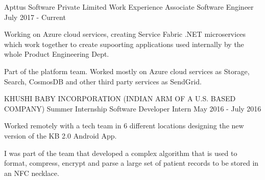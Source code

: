 \begin{cventries}

\cventry
    {Apttus Software Private Limited}
    {Work Experience}
    {Associate Software Engineer}
    {July 2017 - Current}
    {
      \begin{cvitems}
    \item {Working on Azure cloud services, creating Service Fabric .NET microservices which work together to create supoorting applications used internally by the whole Product Engineering Dept.
    }
    \item {Part of the platform team. Worked mostly on Azure cloud services as Storage, Search, CosmosDB and other third party services as SendGrid.
    }
      \end{cvitems}
    }
    
\cventry
    {KHUSHI BABY INCORPORATION (INDIAN ARM OF A U.S. BASED COMPANY)}
    {Summer Internship}
    {Software Developer Intern}
    {May 2016 - July 2016}
    {
      \begin{cvitems}
    \item {Worked remotely with a tech team in 6 different locations designing the new version of the KB 2.0 Android App.
    }
    \item {I was part of the team that developed a complex algorithm that is used to format, compress, encrypt and parse a large set of patient records to be stored in an NFC necklace.
    }
      \end{cvitems}
    }
    



 
\end{cventries}
